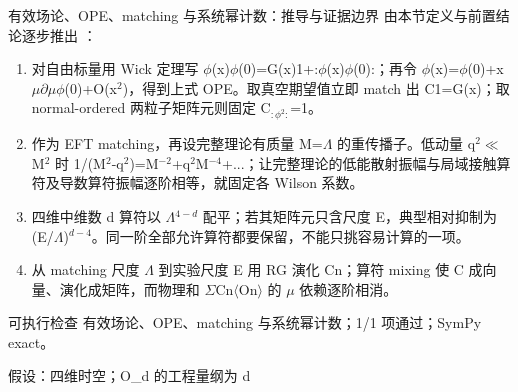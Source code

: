 \begin{frame}[t]{有效场论、OPE、matching 与系统幂计数：推导与证据边界}
\footnotesize
{}\quad 由本节定义与前置结论逐步推出 ：
\begin{enumerate}
\item 对自由标量用 Wick 定理写 \ensuremath{\phi}(x)\ensuremath{\phi}(0)=G(x)1+:\ensuremath{\phi}(x)\ensuremath{\phi}(0):；再令 \ensuremath{\phi}(x)=\ensuremath{\phi}(0)+x\ensuremath{\mu}\ensuremath{\partial}\ensuremath{\mu}\ensuremath{\phi}(0)+O(x\ensuremath{^{2}})，得到上式 OPE。取真空期望值立即 match 出 C1=G(x)；取 normal-ordered 两粒子矩阵元则固定 C\ensuremath{_{:\phi^{2}:}}=1。
\item 作为 EFT matching，再设完整理论有质量 M=\ensuremath{\Lambda} 的重传播子。低动量 q\ensuremath{^{2}}\ensuremath{\ll}M\ensuremath{^{2}} 时 1/\allowbreak{}(M\ensuremath{^{2}}-q\ensuremath{^{2}})=M\ensuremath{^{-2}}+q\ensuremath{^{2}}M\ensuremath{^{-4}}+...；让完整理论的低能散射振幅与局域接触算符及导数算符振幅逐阶相等，就固定各 Wilson 系数。
\item 四维中维数 d 算符以 \ensuremath{\Lambda}\ensuremath{^{4-d}} 配平；若其矩阵元只含尺度 E，典型相对抑制为 (E/\allowbreak{}\ensuremath{\Lambda})\ensuremath{^{d-4}}。同一阶全部允许算符都要保留，不能只挑容易计算的一项。
\item 从 matching 尺度 \ensuremath{\Lambda} 到实验尺度 E 用 RG 演化 Cn；算符 mixing 使 C 成向量、演化成矩阵，而物理和 \ensuremath{\Sigma}Cn\ensuremath{\langle}On\ensuremath{\rangle} 的 \ensuremath{\mu} 依赖逐阶相消。
\end{enumerate}\begin{block}{可执行检查}
\quad 有效场论、OPE、matching 与系统幂计数；1/1 项通过；SymPy exact。
\par\scriptsize 假设：四维时空；O\_d 的工程量纲为 d
\end{block}
\end{frame}

